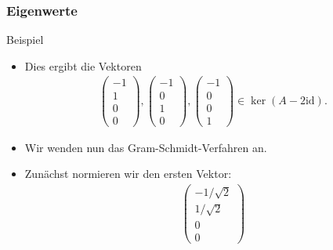 \documentclass{beamer}
\newcommand{\id}{\mathrm{id}}
\renewcommand{\ae}{\"a}
\newcommand{\mytitle}{Eigenwerte}
\begin{document}
\begin{frame}\frametitle{\mytitle}
	\begin{block}{Beispiel}
	\begin{itemize}
		\item Dies ergibt die Vektoren
			\begin{align*}
				\begin{pmatrix} -1\\1\\0\\0 \end{pmatrix},
				\begin{pmatrix} -1\\0\\1\\0 \end{pmatrix},
				\begin{pmatrix} -1\\0\\0\\1 \end{pmatrix}\in\ker(A-2\id).
			\end{align*}
		\item Wir wenden nun das Gram-Schmidt-Verfahren an.
		\item Zun\ae chst normieren wir den ersten Vektor:
			\begin{align*}
				\begin{pmatrix} -1/\sqrt 2\\1/\sqrt 2\\0\\0 \end{pmatrix}
			\end{align*}
	\end{itemize}
	\end{block}
\end{frame}
\end{document}
